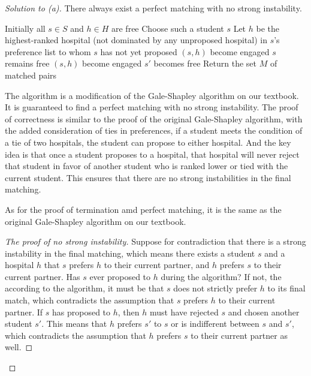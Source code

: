 \documentclass[12pt]{article}
\begin{document}
\begin{enumerate}[leftmargin=*]
\begin{proof}[Solution to (a)]
    There always exist a perfect matching with no strong instability.
    
    \begin{algorithm}
    \caption{G-S Algorithm (for Strong Instability)}
    \begin{algorithmic}
    \STATE Initially all $s \in S$ and $h \in H$ are free
        \STATE Choose such a student $s$
        \STATE Let $h$ be the highest-ranked hospital (not dominated by any unproposed hospital) in $s$'s preference list to whom $s$ has not yet proposed
            \STATE $(s, h)$ become engaged
                \STATE $s$ remains free
            \ELSE[$h$ prefers $s$ to $s'$]
                \STATE $(s, h)$ become engaged
                \STATE $s'$ becomes free
            \ENDIF
        \ENDIF
    \ENDWHILE
    \STATE Return the set $M$ of matched pairs
    \end{algorithmic}
    \end{algorithm}

    The algorithm is a modification of the Gale-Shapley algorithm on our textbook.
    It is guaranteed to find a perfect matching with no strong instability.
    The proof of correctness is similar to the proof of the original Gale-Shapley algorithm, with the added consideration of ties in preferences, if a student meets the condition of a tie of two hospitals, the student can propose to either hospital.
    And the key idea is that once a student proposes to a hospital, that hospital will never reject that student in favor of another student who is ranked lower or tied with the current student.
    This ensures that there are no strong instabilities in the final matching.

    As for the proof of termination amd perfect matching, it is the same as the original Gale-Shapley algorithm on our textbook.

    \begin{proof}[The proof of no strong instability]
        Suppose for contradiction that there is a strong instability in the final matching, which means there exists a student $s$ and a hospital $h$ that $s$ prefers $h$ to their current partner, and $h$ prefers $s$ to their current partner. 
        Has $s$ ever proposed to $h$ during the algorithm? If not, the according to the algorithm, it must be that $s$ does not strictly prefer $h$ to its final match, which contradicts the assumption that $s$ prefers $h$ to their current partner.
        If $s$ has proposed to $h$, then $h$ must have rejected $s$ and chosen another student $s'$. This means that $h$ prefers $s'$ to $s$ or is indifferent between $s$ and $s'$, which contradicts the assumption that $h$ prefers $s$ to their current partner as well.
    \end{proof}
\end{proof}


\end{enumerate}
\end{document}
